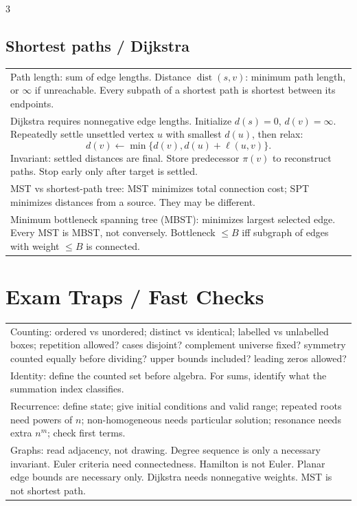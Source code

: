 \documentclass[10pt]{article}
\newcommand{\dist}{\operatorname{dist}}
\begin{document}
\begin{multicols*}{3}
\subsection*{Shortest paths / Dijkstra}
\begin{tabular}{@{}p{}@{}}
Path length: sum of edge lengths. Distance \(\dist(s,v)\): minimum path length, or \(\infty\) if unreachable. Every subpath of a shortest path is shortest between its endpoints.\\
Dijkstra requires nonnegative edge lengths. Initialize \(d(s)=0\), \(d(v)=\infty\). Repeatedly settle unsettled vertex \(u\) with smallest \(d(u)\), then relax:
\[
d(v)\leftarrow\min\{d(v),d(u)+\ell(u,v)\}.
\]
Invariant: settled distances are final. Store predecessor \(\pi(v)\) to reconstruct paths. Stop early only after target is settled.\\
MST vs shortest-path tree: MST minimizes total connection cost; SPT minimizes distances from a source. They may be different.\\
Minimum bottleneck spanning tree (MBST): minimizes largest selected edge. Every MST is MBST, not conversely. Bottleneck \(\le B\) iff subgraph of edges with weight \(\le B\) is connected.\\
\end{tabular}

\section*{Exam Traps / Fast Checks}
\begin{tabular}{@{}p{}@{}}
Counting: ordered vs unordered; distinct vs identical; labelled vs unlabelled boxes; repetition allowed? cases disjoint? complement universe fixed? symmetry counted equally before dividing? upper bounds included? leading zeros allowed?\\
Identity: define the counted set before algebra. For sums, identify what the summation index classifies.\\
Recurrence: define state; give initial conditions and valid range; repeated roots need powers of \(n\); non-homogeneous needs particular solution; resonance needs extra \(n^m\); check first terms.\\
Graphs: read adjacency, not drawing. Degree sequence is only a necessary invariant. Euler criteria need connectedness. Hamilton is not Euler. Planar edge bounds are necessary only. Dijkstra needs nonnegative weights. MST is not shortest path.\\
\end{tabular}


\end{multicols*}
\end{document}
